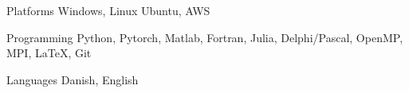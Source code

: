

\begin{cvskills}

  \cvskill
    {Platforms} %
    {Windows, Linux Ubuntu, AWS} %


  \cvskill
    {Programming} %
    {Python, Pytorch, Matlab, Fortran, Julia, Delphi/Pascal, OpenMP, MPI, LaTeX, Git} %

  \cvskill
    {Languages} %
    {Danish, English} %

\end{cvskills}
